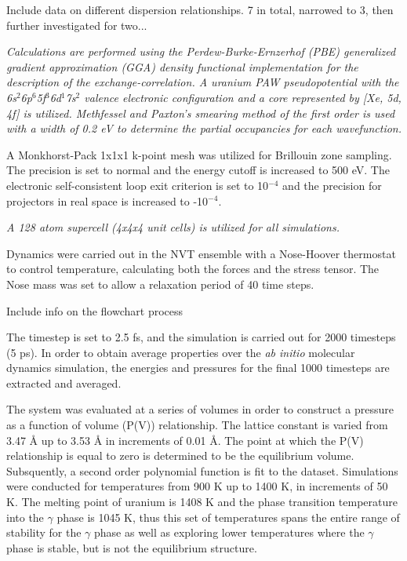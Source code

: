 \documentclass[review]{elsarticle}
\begin{document}
Include data on different dispersion relationships. 7 in total, narrowed to 3, then further investigated for two...

\textit{Calculations are performed using the Perdew-Burke-Ernzerhof (PBE) \cite{pbe1, pbe2} generalized gradient approximation (GGA) density functional implementation for the description of the exchange-correlation. A uranium PAW pseudopotential with the 6s$^{2}$6p$^{6}$5f$^{3}$6d$^{1}$7s$^{2}$ valence electronic configuration and a core represented by [Xe, 5d, 4f] is utilized. Methfessel and Paxton's smearing method \cite{methfessel} of the first order is used with a width of 0.2 eV to determine the partial occupancies for each wavefunction. }


A Monkhorst-Pack \cite{monkhorst} 1x1x1 k-point mesh was utilized for Brillouin zone sampling. The precision is set to normal and the energy cutoff is increased to 500 eV. The electronic self-consistent loop exit criterion is set to 10$^{-4}$ and the precision for projectors in real space is increased to -10$^{-4}$. 

\textit{A 128 atom supercell (4x4x4 unit cells) is utilized for all simulations. }

Dynamics were carried out in the NVT ensemble with a Nose-Hoover thermostat to control temperature, calculating both the forces and the stress tensor. The Nose mass was set to allow a relaxation period of 40 time steps. 

Include info on the flowchart process

The timestep is set to 2.5 fs, and the simulation is carried out for 2000 timesteps (5 ps). In order to obtain average properties over the \textit{ab initio} molecular dynamics simulation, the energies and pressures for the final 1000 timesteps are extracted and averaged. 





\FloatBarrier

The system was evaluated at a series of volumes in order to construct a pressure as a function of volume (P(V)) relationship. The lattice constant is varied from 3.47 {\AA} up to 3.53 {\AA} in increments of 0.01 {\AA}. The point at which the P(V) relationship is equal to zero is determined to be the equilibrium volume. Subsquently, a second order polynomial function is fit to the dataset. Simulations were conducted for temperatures from 900 K up to 1400 K, in increments of 50 K. The melting point of uranium is 1408 K and the phase transition temperature into the $\gamma$ phase is 1045 K, thus this set of temperatures spans the entire range of stability for the $\gamma$ phase as well as exploring lower temperatures where the $\gamma$ phase is stable, but is not the equilibrium structure. 
\end{document}
